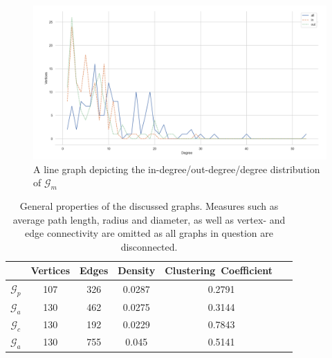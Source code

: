 \documentclass[11pt,a4paper]{book}
\theoremstyle{definition}
\theoremstyle{definition}
\theoremstyle{definition}
\theoremstyle{remark}
\newcommand{\pgraph}{\mathcal{G}_{p}}
\newcommand{\agraph}{\mathcal{G}_{a}}
\newcommand{\cgraph}{\mathcal{G}_{c}}
\newcommand{\acgraph}{\mathcal{G}_{m}}
\begin{document}
\begin{figure}[h]
\includegraphics[width=\textwidth]{acgraph_degree_distribution.png}
\caption{A line graph depicting the in-degree/out-degree/degree distribution of $\acgraph$}
\label{fig:cgraph-degree_distr}
\end{figure}



\begin{center}
\begin{table}
\small
\centering
\begin{tabular}{c| c c c c c}
\toprule
{} &  Vertices & Edges  &  Density & Clustering\ Coefficient\ \\
\midrule
$\pgraph$ & 107  & 326 &  0.0287 &  0.2791 \\
$\agraph$  & 130  & 462 &   0.0275 &  0.3144 \\
$\cgraph$  & 130  & 192 &  0.0229 &  0.7843 \\
$\agraph$  & 130  & 755 & 0.045 &  0.5141 \\
\bottomrule
\end{tabular}
\caption{General properties of the discussed graphs. Measures such as average path length, radius and diameter, as well as vertex- and edge connectivity are omitted as all graphs in question are disconnected.} 
\label{tab:graph-stat}
\end{table}
\end{center}
\end{document}
